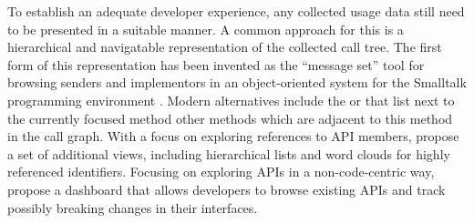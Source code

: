To establish an adequate developer experience, any collected usage data still need to be presented in a suitable manner.
A common approach for this is a hierarchical and navigatable representation of the collected call tree.
The first form of this representation has been invented as the ``message set'' tool for browsing senders and implementors in an object-oriented system for the Smalltalk programming environment \citep[section~10.1f.]{goldberg1984smalltalk}.
Modern alternatives include the  \citep{karrer2011stacksplorer} or  \citep{kramer2012blaze} that list next to the currently focused method other methods which are adjacent to this method in the call graph.
With a focus on exploring references to API members, \citet{de2013multi} propose a set of additional views, including hierarchical lists and word clouds for highly referenced identifiers.
Focusing on exploring APIs in a non-code-centric way, \citet{hora2015apiwave} propose a dashboard that allows developers to browse existing APIs and track possibly breaking changes in their interfaces.
